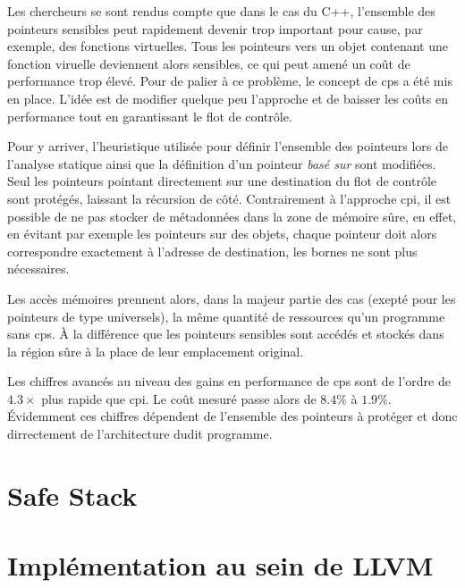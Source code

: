 
Les chercheurs se sont rendus compte que dans le cas du C++, l'ensemble des pointeurs sensibles peut rapidement devenir trop important pour cause, par exemple, des fonctions virtuelles. Tous les pointeurs vers un objet contenant une fonction viruelle deviennent alors sensibles, ce qui peut amené un coût de performance trop élevé. Pour de palier à ce problème, le concept de \gls{cps} a été mis en place. L'idée est de modifier quelque peu l'approche et de baisser les coûts en performance tout en garantissant le flot de contrôle.

Pour y arriver, l'heuristique utilisée pour définir l'ensemble des pointeurs lors de l'analyse statique ainsi que la définition d'un pointeur \textit{basé sur} sont modifiées. Seul les pointeurs pointant directement sur une destination du flot de contrôle sont protégés, laissant la récursion de côté. Contrairement à l'approche \gls{cpi}, il est possible de ne pas stocker de métadonnées dans la zone de mémoire sûre, en effet, en évitant par exemple les pointeurs sur des objets, chaque pointeur doit alors correspondre exactement à l'adresse de destination, les bornes ne sont plus nécessaires.

Les accès mémoires prennent alors, dans la majeur partie des cas (exepté pour les pointeurs de type universels), la même quantité de ressources qu'un programme sans \gls{cps}. À la différence que les pointeurs sensibles sont accédés et stockés dans la région sûre à la place de leur emplacement original.

Les chiffres avancés au niveau des gains en performance de \gls{cps} sont de l'ordre de $4.3\times$ plus rapide que \gls{cpi}. Le coût mesuré passe alors de $8.4\%$ à $1.9\%$. Évidemment ces chiffres dépendent de l'ensemble des pointeurs à protéger et donc dirrectement de l'architecture dudit programme.

\section{Safe Stack}
\label{section:safeStack}


\section{Implémentation au sein de LLVM}

